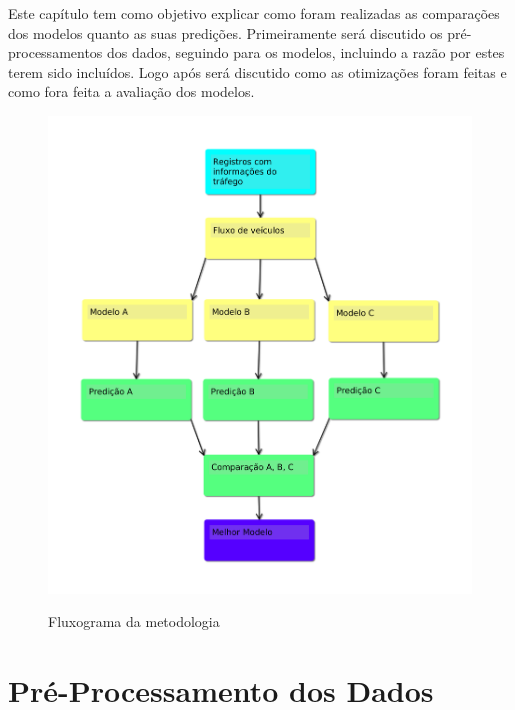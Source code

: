 



Este capítulo tem como objetivo explicar como foram realizadas as comparações dos modelos quanto as suas predições. Primeiramente será discutido os pré-processamentos dos dados, seguindo para os modelos, incluindo a razão por estes terem sido incluídos. Logo após será discutido como as otimizações foram feitas e como fora feita a avaliação dos modelos.

\begin{figure}[H]
    \centering
    \includegraphics[scale=0.4]{monography/img/fluxogramaTCC.png}
    \label{figure:rf}
    \caption[Fluxograma da metodologia]{Fluxograma da metodologia}
\end{figure}

\section{Pré-Processamento dos Dados}

